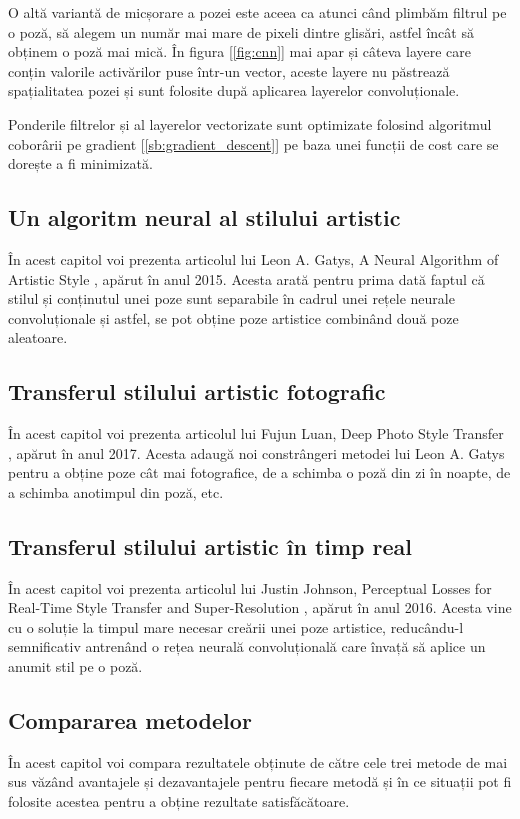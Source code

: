 O altă variantă de micșorare a pozei este aceea ca atunci când plimbăm filtrul pe o poză, să alegem un număr mai mare de pixeli dintre glisări, astfel încât să obținem o poză mai mică. În figura [\ref{fig:cnn}] mai apar și câteva layere care conțin valorile activărilor puse într-un vector, aceste layere nu păstrează spațialitatea pozei și sunt folosite după aplicarea layerelor convoluționale.

Ponderile filtrelor și al layerelor vectorizate sunt optimizate folosind algoritmul coborârii pe gradient [\ref{sb:gradient_descent}] pe baza unei funcții de cost care se dorește a fi minimizată.

\subsection{Un algoritm neural al stilului artistic}
În acest capitol voi prezenta articolul lui Leon A. Gatys, A Neural Algorithm of Artistic Style \cite{gatys2015}, apărut în anul 2015. Acesta arată pentru prima dată faptul că stilul și conținutul unei poze sunt separabile în cadrul unei rețele neurale convoluționale și astfel, se pot obține poze artistice combinând două poze aleatoare.

\subsection{Transferul stilului artistic fotografic}
În acest capitol voi prezenta articolul lui Fujun Luan, Deep Photo Style Transfer \cite{luan2017}, apărut în anul 2017. Acesta adaugă noi constrângeri metodei lui Leon A. Gatys pentru a obține poze cât mai fotografice, de a schimba o poză din zi în noapte, de a schimba anotimpul din poză, etc.

\subsection{Transferul stilului artistic în timp real}
În acest capitol voi prezenta articolul lui Justin Johnson, Perceptual Losses for Real-Time Style Transfer and Super-Resolution \cite{johnson2016}, apărut în anul 2016. Acesta vine cu o soluție la timpul mare necesar creării unei poze artistice, reducându-l semnificativ antrenând o rețea neurală convoluțională care învață să aplice un anumit stil pe o poză.

\subsection{Compararea metodelor}
În acest capitol voi compara rezultatele obținute de către cele trei metode de mai sus văzând avantajele și dezavantajele pentru fiecare metodă și în ce situații pot fi folosite acestea pentru a obține rezultate satisfăcătoare.